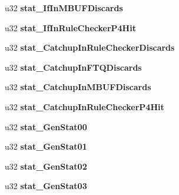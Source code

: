 \begin{DoxyCompactItemize}
\item 
\hypertarget{structstatistics__block_a56e63e269aac2d31878014ec3b6654b7}{
u32 {\bfseries stat\_\-IfInMBUFDiscards}}
\label{structstatistics__block_a56e63e269aac2d31878014ec3b6654b7}

\item 
\hypertarget{structstatistics__block_a30e03c8c4bc076d674f40298d5b6036a}{
u32 {\bfseries stat\_\-IfInRuleCheckerP4Hit}}
\label{structstatistics__block_a30e03c8c4bc076d674f40298d5b6036a}

\item 
\hypertarget{structstatistics__block_a494202e0f7d102a3d8ee5aadfc9bd3ce}{
u32 {\bfseries stat\_\-CatchupInRuleCheckerDiscards}}
\label{structstatistics__block_a494202e0f7d102a3d8ee5aadfc9bd3ce}

\item 
\hypertarget{structstatistics__block_a79dcdf232f50731473a68a3e179ed01d}{
u32 {\bfseries stat\_\-CatchupInFTQDiscards}}
\label{structstatistics__block_a79dcdf232f50731473a68a3e179ed01d}

\item 
\hypertarget{structstatistics__block_ae9a5dd08c43604e675d24e8a11dbebf5}{
u32 {\bfseries stat\_\-CatchupInMBUFDiscards}}
\label{structstatistics__block_ae9a5dd08c43604e675d24e8a11dbebf5}

\item 
\hypertarget{structstatistics__block_a4409ed7a6abe068dc042979e9c6d6c14}{
u32 {\bfseries stat\_\-CatchupInRuleCheckerP4Hit}}
\label{structstatistics__block_a4409ed7a6abe068dc042979e9c6d6c14}

\item 
\hypertarget{structstatistics__block_a7ccfe10ff1742f1b52d6697000c4e09f}{
u32 {\bfseries stat\_\-GenStat00}}
\label{structstatistics__block_a7ccfe10ff1742f1b52d6697000c4e09f}

\item 
\hypertarget{structstatistics__block_ad86b7f20d31cac9d7fff577efdc90204}{
u32 {\bfseries stat\_\-GenStat01}}
\label{structstatistics__block_ad86b7f20d31cac9d7fff577efdc90204}

\item 
\hypertarget{structstatistics__block_a880dbd4c8e3a2dac216668653f9ba39f}{
u32 {\bfseries stat\_\-GenStat02}}
\label{structstatistics__block_a880dbd4c8e3a2dac216668653f9ba39f}

\item 
\hypertarget{structstatistics__block_a918d4919baf50911161166ec1b0a1847}{
u32 {\bfseries stat\_\-GenStat03}}
\label{structstatistics__block_a918d4919baf50911161166ec1b0a1847}


\end{DoxyCompactItemize}
